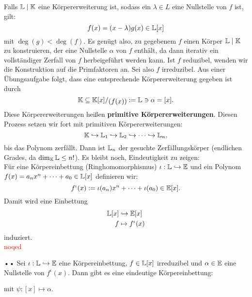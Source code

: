 \begin{beweis}
Falls $\mathbb{L} \mid \mathbb{K}$ eine Körpererweiterung ist, sodass ein $\lambda \in L$ eine Nullstelle von $f$ ist, gilt:
\begin{equation}
f(x) = (x-\lambda) g(x) \in \mathbb{L}[x]
\end{equation}
mit $\deg(g) < \deg(f)$. Es genügt also, zu gegebenem $f$ einen Körper $\mathbb{L} \mid \mathbb{K}$ zu konstruieren, der eine Nullstelle $\alpha$ von $f$ enthält, da dann iterativ ein vollständiger Zerfall von $f$ herbeigeführt werden kann. Ist $f$ reduzibel, wenden wir die Konstruktion auf die Primfaktoren an. Sei also $f$ irreduzibel. Aus einer Übungsaufgabe folgt, dass eine entsprechende Körpererweiterung gegeben ist durch
\begin{equation}
\K \sub \quotient{\K[x]}{(f(x))} := \L \ni \alpha = [x].
\end{equation}
Diese Körpererweiterungen heißen \textbf{primitive Körpererweiterungen}. Diesen Prozess setzen wir fort mit primitiven Körpererweiterungen:
\begin{equation}
\mathbb{K} \hookrightarrow \mathbb{L}_1 \hookrightarrow \mathbb{L}_2 \hookrightarrow \cdots \hookrightarrow \mathbb{L}_n,
\end{equation}
bis das Polynom zerfällt. Dann ist $\mathbb{L}_n$ der gesuchte Zerfällungskörper (endlichen Grades, da $\dim_{\mathbb{K}} \mathbb{L} \leq n!$).
Es bleibt noch, Eindeutigkeit zu zeigen:\\
Für eine Körpereinbettung (Ringhomomorphismus) $\iota: \mathbb{L} \hookrightarrow \mathbb{E}$ und ein Polynom $f(x)=a_nx^n + \cdots + a_0 \in \mathbb{L}[x]$ definieren wir:
\begin{equation}
f^\iota (x) := \iota(a_n)x^n + \cdots + \iota(a_0) \in \mathbb{E}[x].
\end{equation}
Damit wird eine Einbettung
\begin{equation}
\begin{split}
\mathbb{L}[x] &\hookrightarrow \mathbb{E}[x]\\
f &\mapsto f^\iota (x)
\end{split}
\end{equation}
induziert.\\
\textcolor{red}{noqed}
\end{beweis}
\begin{lemma}{•}{•}
Sei $\iota: \mathbb{L} \hookrightarrow \mathbb{E}$ eine Körpereinbettung, $f \in \mathbb{L}[x]$ irreduzibel und $\alpha \in \mathbb{E}$ eine Nullstelle von $f^\iota(x)$. Dann gibt es eine eindeutige Körpereinbettung:
\begin{center}
\end{center}
mit $\psi: [x] \mapsto \alpha$.
\end{lemma}

